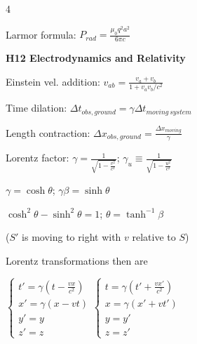 \documentclass[a4paper,twoside]{article}
\newcommand{\secblock}[1]{%
\par\vspace{1.8pt}%
\noindent\colorbox{hdrcol}{\parbox[c][1.0em][c]{0.98\linewidth}{\color{white}\bfseries\small #1}}\par
\vspace{1pt}%
}
\begin{document}
\begin{multicols*}{4}








Larmor formula:
\(P_{rad} = \frac{\mu_0 q^2 a^2}{6 \pi c}\)

\secblock{H12 Electrodynamics and Relativity}

Einstein vel. addition:
\(v_{ab} = \frac{v_a + v_b}{1 + v_a v_b/c^2}\)

Time dilation:
\(\Delta t_{obs, ground} = \gamma \Delta t_{moving\,system}\)

Length contraction:
\(\Delta x_{obs, ground} = \frac{\Delta x_{moving}}{\gamma}\)

Lorentz factor:
\(\gamma = \frac{1}{\sqrt{1 - \frac{v^2}{c^2}}}\);
\(\gamma_u \equiv \frac{1}{\sqrt{1 - \frac{u^2}{c^2}}}\)

\(\gamma = \cosh\theta\); \(\gamma\beta = \sinh\theta\)

\(\cosh^2\theta - \sinh^2\theta = 1\); \(\theta = \tanh^{-1} \beta\)


(\(S'\) is moving to right with \(v\) relative to \(S\))

Lorentz transformations then are

\(\begin{cases}
    t' = \gamma (t -  \frac{v x}{c^2}) \\
    x' = \gamma (x - vt) \\
    y' = y \\
    z' = z
\end{cases}
\begin{cases}
    t = \gamma (t' + \frac{v x'}{c^2}) \\
    x = \gamma (x' + vt') \\
    y = y' \\
    z = z'
\end{cases}\)


\end{multicols*}
\end{document}
